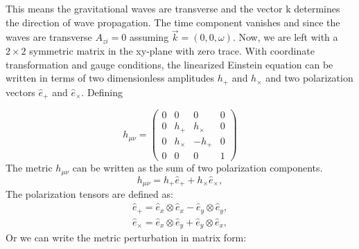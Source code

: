 \documentclass{ttuthes2007}
\begin{document}
This means the gravitational waves are transverse and the vector k
determines the direction of wave propagation. The time component vanishes and
since the waves are transverse $A_{zi}=0$ assuming $\vec{k}=(0,0,\omega)$. Now,
we are left with a $2 \times 2$ symmetric matrix in the xy-plane with zero trace. With coordinate transformation and gauge conditions, the linearized
Einstein equation can be written in terms of two dimensionless amplitudes
$h_+$ and $h_\times$ and two polarization vectors $\hat e_+$ and $\hat
e_\times$. Defining

\begin{equation*}                                                               
h_{\mu\nu}=                                                                  
 \begin{pmatrix}                                                                
    0 & 0 & 0 & 0 \\                                                           
    0 & h_+ & h_\times & 0 \\                                                            
    0 & h_\times & -h_+ & 0 \\                                                            
    0 & 0 & 0 & 1                                                               
 \end{pmatrix}                                                                  
\end{equation*} 
The metric $h_{\mu\nu}$ can be written as the sum of two polarization components.   
\begin{equation}
h_{\mu\nu}=h_+\hat e_+ +h_\times \hat e_\times,
\end{equation}
The polarization tensors are defined as:
\begin{equation}
\begin{aligned}
\hat e_+ = \hat e_x \otimes \hat e_x - \hat e_y \otimes \hat e_y, \\
\hat e_\times = \hat e_x \otimes \hat e_y + \hat e_y \otimes \hat e_x,
\end{aligned}
\end{equation}
Or we can write the metric perturbation in matrix form:
\end{document}
